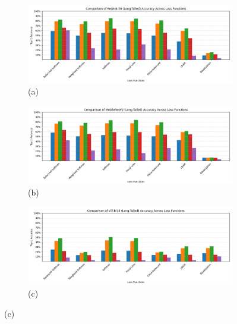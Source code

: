 \begin{figure}[h!]
    \centering
    \begin{subfigure}{0.75\textwidth}
        \centering
        \includegraphics[width=\textwidth]{Images/resnet_lt_loss_comparison_copy.png}
        \caption*{(a)}
        \label{fig:resnet_lt_loss_comparison}
    \end{subfigure}
    \vspace{1em} %

    \begin{subfigure}{0.75\textwidth}
        \centering
        \includegraphics[width=\textwidth]{Images/mobilenet_lt_loss_comparison_copy.png}
        \caption*{(b)}
        \label{fig:mobilenet_lt_loss_comparison}
    \end{subfigure}
    \vspace{1em} %

    \begin{subfigure}{0.75\textwidth}
        \centering
        \includegraphics[width=\textwidth]{Images/vit_lt_loss_comparison_copy.png}
        \caption*{(c)}
        \label{fig:vit_lt_loss_comparison}
    \end{subfigure}
    \vspace{1em} %


\end{figure}
